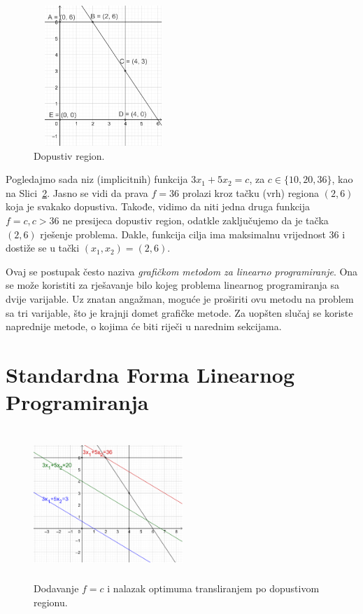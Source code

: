 \documentclass[a4paper, utf8, 11pt, colorlinks]{book}
\begin{document}
\begin{figure}
    \centering
    \includegraphics[width=150pt,height=150pt]{fig1.eps}
    \caption{Dopustiv region.}
    \label{fig:fig1}
\end{figure}
Pogledajmo sada niz (implicitnih) funkcija $3x_1 + 5 x_2 = c$, za $c \in \{10,20, 36\}$, kao na Slici~\ref{fig:fig2}. Jasno se vidi da prava $f = 36$ prolazi kroz tačku (vrh) regiona $(2,6)$ koja je svakako dopustiva. Takođe, vidimo da niti jedna druga funkcija $f=c, c > 36$ ne presijeca dopustiv region, odatkle zaključujemo da je tačka $(2, 6)$ rješenje problema. Dakle, funkcija cilja ima maksimalnu vrijednost 36 i dostiže se u tački $(x_1, x_2)=(2,6)$.

Ovaj se postupak često naziva \emph{grafičkom metodom za linearno programiranje}. Ona se može koristiti za rješavanje bilo kojeg problema linearnog programiranja sa dvije varijable. Uz znatan angažman, moguće je proširiti ovu metodu na problem sa tri varijable, što je krajnji domet grafičke metode. Za uopšten slučaj se koriste naprednije metode,  o kojima će biti riječi u narednim sekcijama.

\section{Standardna Forma Linearnog Programiranja}

\begin{figure}[!ht]
    \centering
    \includegraphics[width=160pt, height=160pt]{fig2.eps}
    \caption{Dodavanje $f = c$ i nalazak optimuma transliranjem po dopustivom regionu.}
    \label{fig:fig2}
\end{figure}
\end{document}
